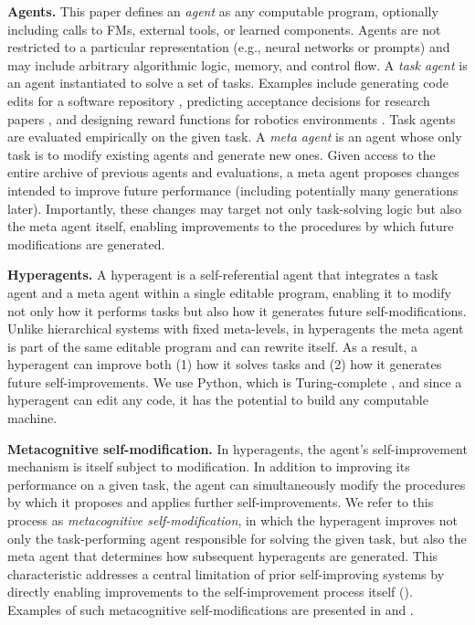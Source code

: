 \documentclass[]{fairmeta}
\begin{document}
\textbf{Agents.} This paper defines an \textit{agent} as any computable program, optionally including calls to FMs, external tools, or learned components. Agents are not restricted to a particular representation (e.g., neural networks or prompts) and may include arbitrary algorithmic logic, memory, and control flow.
A \textit{task agent} is an agent instantiated to solve a set of tasks. Examples include generating code edits for a software repository \citep{gauthier2024polyglot, jimenez2024swebench}, predicting acceptance decisions for research papers \citep{couto2024relevai}, and designing reward functions for robotics environments \citep{maeureka}. Task agents are evaluated empirically on the given task.
A \textit{meta agent} is an agent whose only task is to modify existing agents and generate new ones. Given access to the entire archive of previous agents and evaluations, a meta agent proposes changes intended to improve future performance (including potentially many generations later). Importantly, these changes may target not only task-solving logic but also the meta agent itself, enabling improvements to the procedures by which future modifications are generated.

\textbf{Hyperagents.} A hyperagent is a self-referential agent that integrates a task agent and a meta agent within a single editable program, enabling it to modify not only how it performs tasks but also how it generates future self-modifications. Unlike hierarchical systems with fixed meta-levels, in hyperagents the meta agent is part of the same editable program and can rewrite itself. As a result, a hyperagent can improve both (1) how it solves tasks and (2) how it generates future self-improvements. We use Python, which is Turing-complete \citep{turing1936computable}, and since a hyperagent can edit any code, it has the potential to build any computable machine.

\textbf{Metacognitive self-modification.} In hyperagents, the agent's self-improvement mechanism is itself subject to modification. In addition to improving its performance on a given task, the agent can simultaneously modify the procedures by which it proposes and applies further self-improvements. We refer to this process as \textit{metacognitive self-modification}, in which the hyperagent improves not only the task-performing agent responsible for solving the given task, but also the meta agent that determines how subsequent hyperagents are generated. This characteristic addresses a central limitation of prior self-improving systems \citep{zhang2025darwin, wang2025huxley} by directly enabling improvements to the self-improvement process itself (). Examples of such metacognitive self-modifications are presented in  and .
\end{document}

